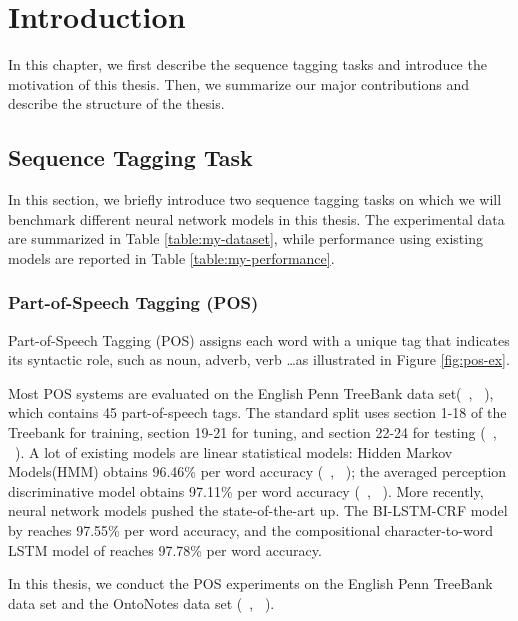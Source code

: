 \documentclass{sfuthesis}
\begin{document}
\mainmatter%

\chapter{Introduction}

In this chapter, we first describe the sequence tagging tasks and introduce the motivation of this thesis. Then, we summarize our major contributions and describe the structure of the thesis.

\section{Sequence Tagging Task}

In this section, we briefly introduce two sequence tagging tasks on which we will benchmark different neural network models in this thesis. The experimental data are summarized in Table \ref{table:my-dataset}, while performance using existing models are reported in Table \ref{table:my-performance}.

\subsection{Part-of-Speech Tagging (POS)}
Part-of-Speech Tagging (POS) assigns each word with a unique tag that indicates its syntactic role, such as noun, adverb, verb \dots as illustrated in Figure \ref{fig:pos-ex}. 

Most POS systems are evaluated on the English Penn TreeBank data set(~\citeauthor{marcus1993building}, ~\citeyear{marcus1993building}), which contains 45 part-of-speech tags. The standard split uses section 1-18 of the Treebank for training, section 19-21 for tuning, and section 22-24 for testing (~\citeauthor{toutanova2003feature}, ~\citeyear{toutanova2003feature}). A lot of existing models are linear statistical models: Hidden Markov Models(HMM) obtains 96.46\% per word accuracy (~\citeauthor{mccallum2000maximum}, ~\citeyear{mccallum2000maximum}); the averaged perception discriminative model obtains 97.11\% per word accuracy (~\citeauthor{collins2002discriminative}, ~\citeyear{collins2002discriminative}). More recently, neural network models pushed the state-of-the-art up. The BI-LSTM-CRF model by \cite{huang2015bidirectional} reaches 97.55\% per word accuracy, and the compositional character-to-word LSTM model of \cite{ling2015finding} reaches 97.78\% per word accuracy. 

In this thesis, we conduct the POS experiments on the English Penn TreeBank data set and the OntoNotes data set (~\citeauthor{hovy2006ontonotes}, ~\citeyear{hovy2006ontonotes}).
\end{document}
